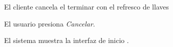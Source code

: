 {\begin{trayectoriaAlternativa}
  \end{trayectoriaAlternativa}


  \begin{trayectoriaAlternativa}
    {El cliente cancela el terminar con el refresco de llaves}

    \item El usuario presiona \textit{Cancelar}.

    \item El sistema muestra la interfaz de inicio
      .

  \end{trayectoriaAlternativa}
}
